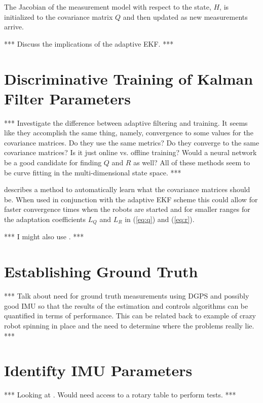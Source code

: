 The Jacobian of the measurement model with respect to the state, $H$, is initialized to the covariance matrix $Q$ and then updated as new measurements arrive.

*** Discuss the implications of the adaptive EKF. ***

\section{Discriminative Training of Kalman Filter Parameters}
\label{sec:trainingkfparams}
*** Investigate the difference between adaptive filtering and training. It seems like they accomplish the same thing, namely, convergence to some values for the covariance matrices. Do they use the same metrics? Do they converge to the same covariance matrices? Is it just online vs. offline training? Would a neural network be a good candidate for finding $Q$ and $R$ as well? All of these methods seem to be curve fitting in the multi-dimensional state space. ***

\cite{Abbeel-RSS-05} describes a method to automatically learn what the covariance matrices should be. When used in conjunction with the adaptive EKF scheme this could allow for faster convergence times when the robots are started and for smaller ranges for the adaptation coefficients $L_Q$ and $L_R$ in (\ref{eq:q}) and (\ref{eq:r}).

*** I might also use \cite{Orderud05}. ***

\section{Establishing Ground Truth}
\label{sec:groundtruth}
*** Talk about need for ground truth measurements using DGPS and possibly good IMU so that the results of the estimation and controls algorithms can be quantified in terms of performance. This can be related back to example of crazy robot spinning in place and the need to determine where the problems really lie. ***

\section{Identifty IMU Parameters}
\label{sec:identifyimuparams}
*** Looking at \cite{ChungOjeda01}. Would need access to a rotary table to perform tests. ***